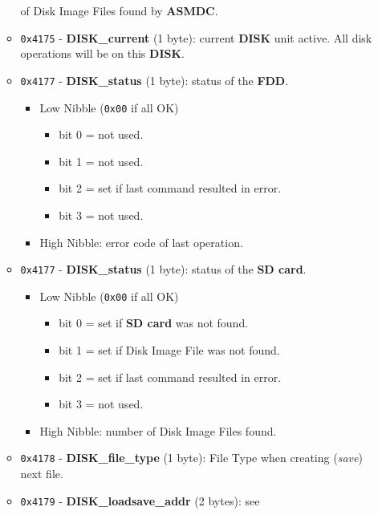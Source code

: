 \documentclass[a4paper,11pt]{article}
\begin{document}
\begin{itemize}
\begin{itemize}
            of Disk Image Files found by \textbf{ASMDC}.
            \item \texttt{0x4175} - \textbf{DISK\_current} (1 byte): current 
            \textbf{DISK} unit active. All disk operations will be on this
            \textbf{DISK}.
            \item \texttt{0x4177} - \textbf{DISK\_status} (1 byte): status of
            the \textbf{FDD}.
            \begin{itemize}
                \item Low Nibble (\texttt{0x00} if all OK)
                \begin{itemize}
                    \item bit 0 = not used.
                    \item bit 1 = not used.
                    \item bit 2 = set if last command resulted in error.
                    \item bit 3 = not used.
                \end{itemize}
                \item High Nibble: error code of last operation.
            \end{itemize}
            \item \texttt{0x4177} - \textbf{DISK\_status} (1 byte): status of
            the \textbf{SD card}.
            \begin{itemize}
                \item Low Nibble (\texttt{0x00} if all OK)
                \begin{itemize}
                    \item bit 0 = set if \textbf{SD card} was not found.
                    \item bit 1 = set if Disk Image File was not found.
                    \item bit 2 = set if last command resulted in error.
                    \item bit 3 = not used.
                \end{itemize}
                \item High Nibble: number of Disk Image Files found.
            \end{itemize}
            \item \texttt{0x4178} - \textbf{DISK\_file\_type} (1 byte): File
            Type when creating (\textit{save}) next file.
            \item \texttt{0x4179} - \textbf{DISK\_loadsave\_addr} (2 bytes): see

\end{itemize}
\end{itemize}
\end{document}
